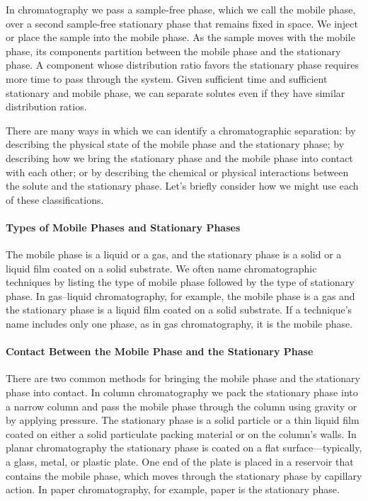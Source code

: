 \documentclass[
]{krantz}
\begin{document}
In chromatography we pass a sample-free phase, which we call the mobile phase, over a second sample-free stationary phase that remains fixed in space. We inject or place the sample into the mobile phase. As the sample moves with the mobile phase, its components partition between the mobile phase and the stationary phase. A component whose distribution ratio favors the stationary phase requires more time to pass through the system. Given sufficient time and sufficient stationary and mobile phase, we can separate solutes even if they have similar distribution ratios.

There are many ways in which we can identify a chromatographic separation: by describing the physical state of the mobile phase and the stationary phase; by describing how we bring the stationary phase and the mobile phase into contact with each other; or by describing the chemical or physical interactions between the solute and the stationary phase. Let's briefly consider how we might use each of these classifications.

\hypertarget{types-of-mobile-phases-and-stationary-phases}{%
\paragraph{Types of Mobile Phases and Stationary Phases}\label{types-of-mobile-phases-and-stationary-phases}}

The mobile phase is a liquid or a gas, and the stationary phase is a solid or a liquid film coated on a solid substrate. We often name chromatographic techniques by listing the type of mobile phase followed by the type of stationary phase. In gas--liquid chromatography, for example, the mobile phase is a gas and the stationary phase is a liquid film coated on a solid substrate. If a technique's name includes only one phase, as in gas chromatography, it is the mobile phase.

\hypertarget{contact-between-the-mobile-phase-and-the-stationary-phase}{%
\paragraph{Contact Between the Mobile Phase and the Stationary Phase}\label{contact-between-the-mobile-phase-and-the-stationary-phase}}

There are two common methods for bringing the mobile phase and the stationary phase into contact. In column chromatography we pack the stationary phase into a narrow column and pass the mobile phase through the column using gravity or by applying pressure. The stationary phase is a solid particle or a thin liquid film coated on either a solid particulate packing material or on the column's walls. In planar chromatography the stationary phase is coated on a flat surface---typically, a glass, metal, or plastic plate. One end of the plate is placed in a reservoir that contains the mobile phase, which moves through the stationary phase by capillary action. In paper chromatography, for example, paper is the stationary phase.
\end{document}
